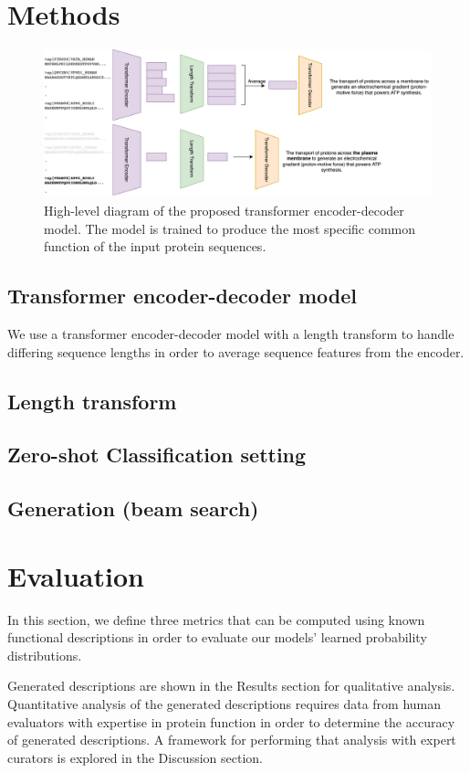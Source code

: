 \documentclass{specification}
\begin{document}
\section{Methods}
\begin{figure}
    \centering
    \includegraphics[width=0.9\linewidth]{prot2go.png}
    \caption{High-level diagram of the proposed transformer encoder-decoder model.
The model is trained to produce the most specific common function of the input protein sequences.}
    \label{overview}
\end{figure}
    \subsection{Transformer encoder-decoder model}
    We use a transformer encoder-decoder model \cite{vaswani2017} with a length transform \cite{Shu2019} to handle differing sequence lengths in order to average sequence features from the encoder.
    \subsection{Length transform}
    \subsection{Zero-shot Classification setting}
    \subsection{Generation (beam search)}
\section{Evaluation}
In this section, we define three metrics that can be computed using known functional descriptions in order to evaluate our models' learned probability distributions.

Generated descriptions are shown in the Results section for qualitative analysis.
Quantitative analysis of the generated descriptions requires data from human evaluators with expertise in protein function in order to determine the accuracy of generated descriptions.
A framework for performing that analysis with expert curators is explored in the Discussion section.
\end{document}
